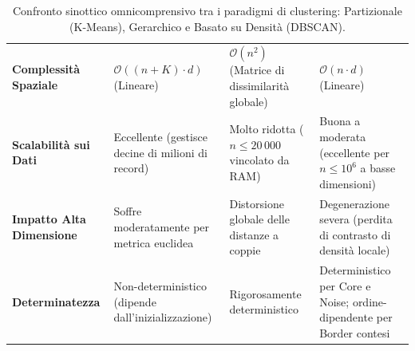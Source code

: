 \begin{table}[H]
{\begin{tabularx}{\textwidth}{l Y Y Y}
\textbf{Complessità Spaziale} & $\mathcal{O}((n + K) \cdot d)$ (Lineare) & $\mathcal{O}(n^2)$ (Matrice di dissimilarità globale) & $\mathcal{O}(n \cdot d)$ (Lineare) \\
\textbf{Scalabilità sui Dati} & Eccellente (gestisce decine di milioni di record) & Molto ridotta ($n \le 20\,000$ vincolato da RAM) & Buona a moderata (eccellente per $n \le 10^6$ a basse dimensioni) \\
\textbf{Impatto Alta Dimensione} & Soffre moderatamente per metrica euclidea & Distorsione globale delle distanze a coppie & Degenerazione severa (perdita di contrasto di densità locale) \\
\textbf{Determinatezza} & Non-deterministico (dipende dall'inizializzazione) & Rigorosamente deterministico & Deterministico per Core e Noise; ordine-dipendente per Border contesi \\
\bottomrule
\end{tabularx}%
}
\caption{Confronto sinottico omnicomprensivo tra i paradigmi di clustering: Partizionale (K-Means), Gerarchico e Basato su Densità (DBSCAN).}
\label{tab:dm-clustering-all-comparison}
\end{table}
